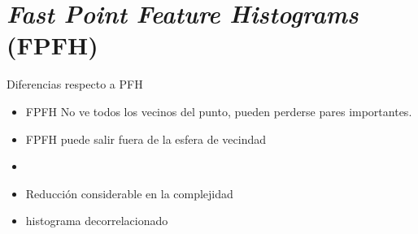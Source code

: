 \section{\emph{Fast Point Feature Histograms} (FPFH)}
Diferencias respecto a PFH
\begin{itemize}
	\item FPFH No ve todos los vecinos del punto, pueden perderse pares importantes.
	\item FPFH puede salir fuera de la esfera de vecindad
	\item {}
	\item Reducción considerable en la complejidad
	\item histograma decorrelacionado
\end{itemize}

